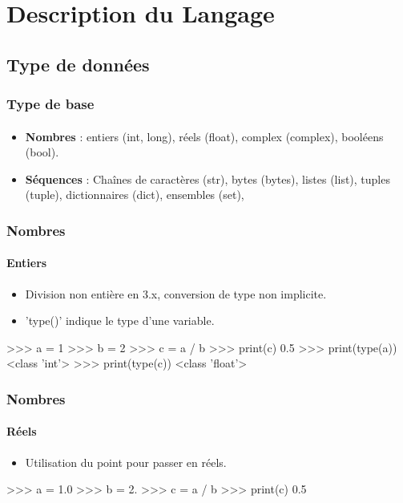 \section{Description du Langage}
\subsection{Type de données}
\begin{frame}
\frametitle{Type de base}
\framesubtitle{}
\begin{itemize}
\item {\bfseries Nombres} : entiers (int, long), réels (float), complex (complex), booléens (bool). 
\item {\bfseries Séquences} : Chaînes de caractères (str), bytes (bytes), listes (list), tuples (tuple), dictionnaires (dict), ensembles (set), 
\end{itemize}
\end{frame}
\begin{frame}[fragile]
\frametitle{Nombres}
\framesubtitle{Entiers}
\begin{itemize}
 \item Division non entière en 3.x, conversion de type non implicite. 
 \item 'type()' indique le type d'une variable.
\end{itemize}
\begin{pythonConsole}
>>> a = 1  
>>> b = 2
>>> c = a / b
>>> print(c)
0.5 
>>> print(type(a))
<class 'int'>
>>> print(type(c))
<class 'float'>
\end{pythonConsole}
\end{frame}
\begin{frame}[fragile]
\frametitle{Nombres}
\framesubtitle{Réels}
\begin{itemize}
 \item Utilisation du point pour passer en réels.  
\end{itemize}
\begin{pythonConsole}
>>> a = 1.0
>>> b = 2.
>>> c = a / b
>>> print(c)
0.5
\end{pythonConsole}
\end{frame}
